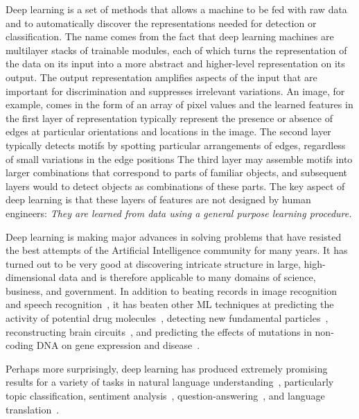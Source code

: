 \documentclass[10pts]{article}
\begin{document}
Deep learning is a set of methods that allows a machine to be fed with
raw data and to automatically discover the representations needed for
detection or classification. The name comes from the fact that deep learning machines are
multilayer stacks of trainable modules, each of which turns the
representation of the data on its input into a more abstract and
higher-level representation on its output. The output representation
amplifies aspects of the input that are important for discrimination
and suppresses irrelevant variations. An image, for example, comes in the form of an array of
pixel values and the learned features in the first layer of representation
typically represent the presence
or absence of edges at  particular orientations and locations in
the image. The second layer typically detects motifs by spotting particular
arrangements of edges, regardless of small variations in the edge positions
The third layer  may assemble motifs into larger
combinations that correspond to parts of familiar
objects, and subsequent layers would to detect objects as combinations of
these parts. The key aspect of deep learning is that these layers of
features are not designed by human engineers: {\em They are learned from
data using a general purpose learning procedure.}

Deep learning is making major advances in solving problems that have
resisted the best attempts of the Artificial Intelligence community
for many years. It has turned out to be very good at discovering
intricate structure in large, high-dimensional data and is therefore
applicable to many domains of science, business, and government. In
addition to beating records in image
recognition~\citep{Krizhevsky-2012-small,farabet-pami-13,tompson-nips-14,szegedy-2014}
and speech
recognition~\citep{Hinton-et-al-2012,Sainath-et-al-ICASSP2013}, it has
beaten other ML techniques at predicting the activity of potential
drug molecules~\citep{Ma-et-al-2015}, detecting new fundamental
particles~\citep{Ciodaro-et-al-2012,Melis-Higgs-boson-competition-2014},
reconstructing brain circuits~\citep{helmstaedter-nature-2013}, and
predicting the effects of mutations in non-coding DNA on gene
expression and disease~\citep{Keung-et-al-2014,Xiong-et-al-Frey-science2015}.

Perhaps more surprisingly, deep learning has produced extremely
promising results for a variety of tasks in natural language
understanding~\citep{collobert:2011b}, particularly topic
classification, %
sentiment
analysis~\citep{Glorot+al-ICML-2011-small},
question-answering~\cite{Bordes-et-al-EMNLP2014}, and language
translation~\cite{Jean-et-al-arxiv2014,Sutskever-et-al-NIPS2014}.
\end{document}
